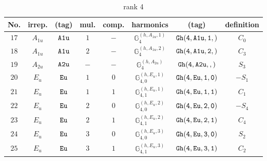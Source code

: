 \documentclass[fleqn,8pt]{jsarticle}
\begin{document}
\begin{table}[ht!]
\begin{center}
\caption{rank 4}
\renewcommand{\arraystretch}{1.3}
\begin{tabular}{cccccccc} \hline \hline
No. & irrep. & (tag) & mul. & comp. & harmonics & (tag) & definition \\ \hline
$ 17 $ & $ A_{1u} $ & $ {\tt A1u} $ & $ 1 $ & $ - $ & $ \mathbb{G}_{4}^{(h,A_{1u},1)} $ & $ {\tt Gh(4,A1u,1,)} $ & $ C_{0} $ \\
$ 18 $ & $ A_{1u} $ & $ {\tt A1u} $ & $ 2 $ & $ - $ & $ \mathbb{G}_{4}^{(h,A_{1u},2)} $ & $ {\tt Gh(4,A1u,2,)} $ & $ C_{3} $ \\
$ 19 $ & $ A_{2u} $ & $ {\tt A2u} $ & $ - $ & $ - $ & $ \mathbb{G}_{4}^{(h,A_{2u})} $ & $ {\tt Gh(4,A2u,,)} $ & $ S_{3} $ \\
$ 20 $ & $ E_{u} $ & $ {\tt Eu} $ & $ 1 $ & $ 0 $ & $ \mathbb{G}_{4,0}^{(h,E_{u},1)} $ & $ {\tt Gh(4,Eu,1,0)} $ & $ - S_{1} $ \\
$ 21 $ & $ E_{u} $ & $ {\tt Eu} $ & $ 1 $ & $ 1 $ & $ \mathbb{G}_{4,1}^{(h,E_{u},1)} $ & $ {\tt Gh(4,Eu,1,1)} $ & $ C_{1} $ \\
$ 22 $ & $ E_{u} $ & $ {\tt Eu} $ & $ 2 $ & $ 0 $ & $ \mathbb{G}_{4,0}^{(h,E_{u},2)} $ & $ {\tt Gh(4,Eu,2,0)} $ & $ - S_{4} $ \\
$ 23 $ & $ E_{u} $ & $ {\tt Eu} $ & $ 2 $ & $ 1 $ & $ \mathbb{G}_{4,1}^{(h,E_{u},2)} $ & $ {\tt Gh(4,Eu,2,1)} $ & $ C_{4} $ \\
$ 24 $ & $ E_{u} $ & $ {\tt Eu} $ & $ 3 $ & $ 0 $ & $ \mathbb{G}_{4,0}^{(h,E_{u},3)} $ & $ {\tt Gh(4,Eu,3,0)} $ & $ S_{2} $ \\
$ 25 $ & $ E_{u} $ & $ {\tt Eu} $ & $ 3 $ & $ 1 $ & $ \mathbb{G}_{4,1}^{(h,E_{u},3)} $ & $ {\tt Gh(4,Eu,3,1)} $ & $ C_{2} $ \\
 \hline \hline
\end{tabular}
\end{center}
\end{table}
\end{document}
